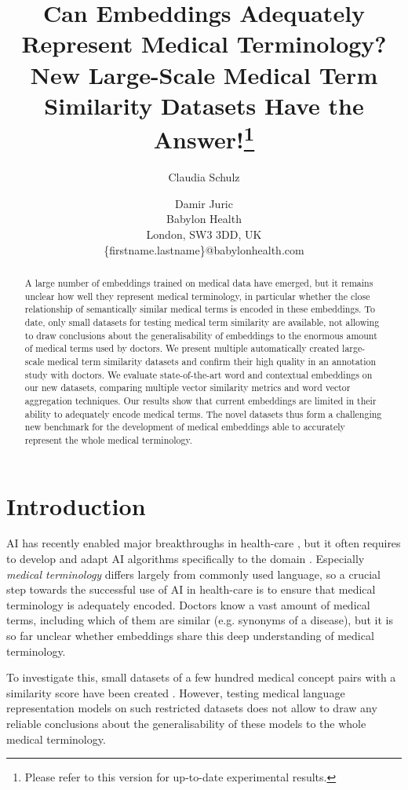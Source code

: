 \documentclass[letterpaper]{article} %
\title{Can Embeddings Adequately Represent Medical Terminology?\\ New Large-Scale Medical Term Similarity Datasets Have the Answer!\thanks{Please refer to this version for up-to-date experimental results.}}
\author{Claudia Schulz \and Damir Juric\\
Babylon Health\\
London, SW3 3DD, UK\\
\{firstname.lastname\}@babylonhealth.com}
\begin{document}
\maketitle

\begin{abstract}
A large number of embeddings trained on medical data have emerged, but it remains unclear how well they represent medical terminology, in particular whether the close relationship of semantically similar medical terms is encoded in these embeddings.
To date, only small datasets for testing medical term similarity are available, not allowing to draw conclusions about the generalisability of embeddings to the enormous amount of medical terms used by doctors. 
We present multiple automatically created large-scale medical term similarity datasets and confirm their high quality in an annotation study with doctors.
We evaluate state-of-the-art word and contextual embeddings on our new datasets, comparing multiple vector similarity metrics and word vector aggregation techniques.
Our results show that current embeddings are limited in their ability to adequately encode medical terms.
The novel datasets thus form a challenging new benchmark for the development of medical embeddings able to accurately represent the whole medical terminology.
\end{abstract}


\section{Introduction}

AI has recently enabled major breakthroughs in health-care \cite{ardila2019end,liu2018deep}, but it often requires to develop and adapt AI algorithms specifically to the domain \cite{Neumann2019ScispaCyFA}.
Especially \emph{medical terminology} differs largely from commonly used language, so
a crucial step towards the successful use of AI in health-care is to ensure that medical terminology is adequately encoded.
Doctors know a vast amount of medical terms, including which of them are similar (e.g. synonyms of a disease), but it is so far unclear whether 
embeddings
share this deep understanding of medical terminology. 

To investigate this, small datasets of a few hundred medical concept pairs
with a similarity score
have been created
\cite{PedersenPPC2007,PakhomovEtAl2010,ChiuPVK2018}.
However, testing medical language representation models on such restricted datasets does not allow to draw any reliable conclusions about the generalisability of these models to the whole medical terminology.
\end{document}
